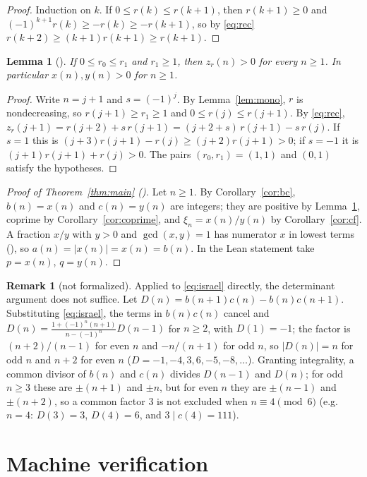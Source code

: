 \documentclass[11pt]{amsart}
\theoremstyle{plain}
\newtheorem{lemma}[theorem]{Lemma}
\theoremstyle{definition}
\newtheorem{remark}[theorem]{Remark}
\begin{document}
\begin{proof}
Induction on $k$. If $0\le r(k)\le r(k+1)$, then $r(k+1)\ge0$ and $(-1)^{k+1}r(k)\ge-r(k)\ge-r(k+1)$, so by \eqref{eq:rec} $r(k+2)\ge(k+1)r(k+1)\ge r(k+1)$.
\end{proof}

\begin{lemma}[]\label{lem:pos}
If $0\le r_0\le r_1$ and $r_1\ge1$, then $z_r(n)>0$ for every $n\ge1$. In particular $x(n),y(n)>0$ for $n\ge1$.
\end{lemma}

\begin{proof}
Write $n=j+1$ and $s=(-1)^j$. By Lemma~\ref{lem:mono}, $r$ is nondecreasing, so $r(j+1)\ge r_1\ge1$ and $0\le r(j)\le r(j+1)$. By \eqref{eq:rec}, $z_r(j+1)=r(j+2)+s\,r(j+1)=(j+2+s)\,r(j+1)-s\,r(j)$.
If $s=1$ this is $(j+3)r(j+1)-r(j)\ge(j+2)r(j+1)>0$; if $s=-1$ it is $(j+1)r(j+1)+r(j)>0$. The pairs $(r_0,r_1)=(1,1)$ and $(0,1)$ satisfy the hypotheses.
\end{proof}

\begin{proof}[Proof of Theorem~\ref{thm:main} ()]
Let $n\ge1$. By Corollary~\ref{cor:bc}, $b(n)=x(n)$ and $c(n)=y(n)$ are integers; they are positive by Lemma~\ref{lem:pos}, coprime by Corollary~\ref{cor:coprime}, and $\xi_n=x(n)/y(n)$ by Corollary~\ref{cor:cf}.
A fraction $x/y$ with $y>0$ and $\gcd(x,y)=1$ has numerator $x$ in lowest terms (), so $a(n)=|x(n)|=x(n)=b(n)$. In the Lean statement take $p=x(n)$, $q=y(n)$.
\end{proof}

\begin{remark}[not formalized]\label{rem:D}
Applied to \eqref{eq:israel} directly, the determinant argument does not suffice. Let $D(n)=b(n+1)c(n)-b(n)c(n+1)$. Substituting \eqref{eq:israel}, the terms in $b(n)c(n)$ cancel and $D(n)=\frac{1+(-1)^n(n+1)}{n-(-1)^n}D(n-1)$ for $n\ge2$, with $D(1)=-1$; the factor is $(n+2)/(n-1)$ for even $n$ and $-n/(n+1)$ for odd $n$, so $|D(n)|=n$ for odd $n$ and $n+2$ for even $n$ ($D=-1,-4,3,6,-5,-8,\dots$). Granting integrality, a common divisor of $b(n)$ and $c(n)$ divides $D(n-1)$ and $D(n)$; for odd $n\ge3$ these are $\pm(n+1)$ and $\pm n$, but for even $n$ they are $\pm(n-1)$ and $\pm(n+2)$, so a common factor $3$ is not excluded when $n\equiv4\pmod6$ (e.g.\ $n=4$: $D(3)=3$, $D(4)=6$, and $3\mid c(4)=111$).
\end{remark}

\section{Machine verification}\label{sec:lean}
\end{document}
